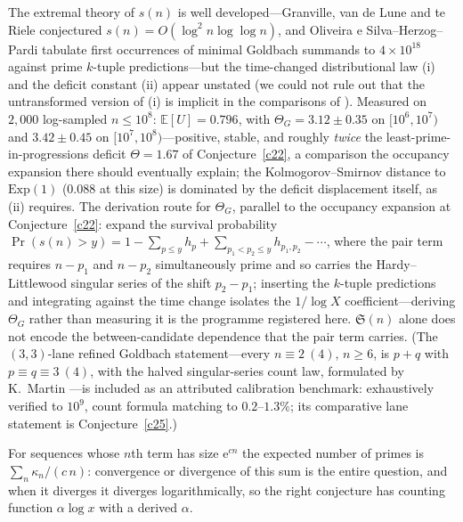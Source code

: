 \documentclass[11pt]{article}
\theoremstyle{definition}
\newcommand{\e}{\mathrm{e}}
\newcommand{\SG}{\mathfrak S}
\begin{document}
The extremal theory of $s(n)$ is well developed---Granville, van de
Lune and te Riele conjectured $s(n)=O(\log^2n\log\log n)$, and
Oliveira e Silva--Herzog--Pardi \cite{OSHP} tabulate first
occurrences of minimal Goldbach summands to $4\times10^{18}$ against
prime $k$-tuple predictions---but the time-changed distributional
law (i) and the deficit constant (ii) appear unstated (we could not
rule out that the untransformed version of (i) is implicit in the
comparisons of \cite{OSHP}).  Measured on $2{,}000$
log-sampled $n\le10^8$: $\mathbb E[U]=0.796$, with
$\Theta_G=3.12\pm0.35$ on $[10^6,10^7)$ and $3.42\pm0.45$ on
$[10^7,10^8)$---positive, stable, and roughly \emph{twice} the
least-prime-in-progressions deficit $\Theta=1.67$ of
Conjecture~\ref{c22}, a comparison the occupancy expansion there
should eventually explain; the Kolmogorov--Smirnov distance to
$\mathrm{Exp}(1)$ ($0.088$ at this size) is dominated by the deficit
displacement itself, as (ii) requires.  The derivation route for
$\Theta_G$, parallel to the occupancy expansion at
Conjecture~\ref{c22}: expand the survival probability
$\Pr(s(n)>y)=1-\sum_{p\le y}h_p+\sum_{p_1<p_2\le y}h_{p_1,p_2}
-\cdots$, where the pair term requires $n-p_1$ and $n-p_2$
simultaneously prime and so carries the Hardy--Littlewood singular
series of the shift $p_2-p_1$; inserting the $k$-tuple predictions
and integrating against the time change isolates the $1/\log X$
coefficient---deriving $\Theta_G$ rather than measuring it is the
programme registered here.  $\SG(n)$ alone does not encode the
between-candidate dependence that the pair term carries.  (The $(3,3)$-lane
refined
Goldbach statement---every $n\equiv2\ (4)$, $n\ge6$,
is $p+q$ with $p\equiv q\equiv3\ (4)$, with the halved
singular-series count law, formulated by K.~Martin
\cite{Martin}---is included as an attributed calibration benchmark:
exhaustively
verified to $10^9$, count formula matching to $0.2$--$1.3\%$; its
comparative lane statement is Conjecture~\ref{c25}.)

For sequences whose $n$th term has size $\e^{cn}$ the expected number of
primes is $\sum_n \kappa_n/(c\,n)$: convergence or divergence of this
sum is the entire question, and when it diverges it diverges
logarithmically, so the right conjecture has counting function
$\alpha\log x$ with a derived $\alpha$.
\end{document}
